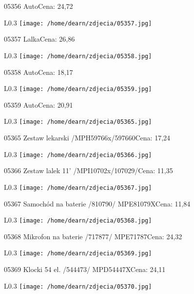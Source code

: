 05356 AutoCena: 24,72\newline
\begin{wrapfigure}{L}{0.3\textwidth}
\texttt{[image: /home/dearn/zdjecia/05357.jpg]}
\end{wrapfigure}
05357 LalkaCena: 26,86\newline
\begin{wrapfigure}{L}{0.3\textwidth}
\texttt{[image: /home/dearn/zdjecia/05358.jpg]}
\end{wrapfigure}
05358 AutoCena: 18,17\newline
\begin{wrapfigure}{L}{0.3\textwidth}
\texttt{[image: /home/dearn/zdjecia/05359.jpg]}
\end{wrapfigure}
05359 AutoCena: 20,91\newline
\begin{wrapfigure}{L}{0.3\textwidth}
\texttt{[image: /home/dearn/zdjecia/05365.jpg]}
\end{wrapfigure}
05365 Zestaw lekarski /MPH59766x/597660Cena: 17,24\newline
\begin{wrapfigure}{L}{0.3\textwidth}
\texttt{[image: /home/dearn/zdjecia/05366.jpg]}
\end{wrapfigure}
05366 Zestaw lalek 11' /MPI10702x/107029/Cena: 11,35\newline
\begin{wrapfigure}{L}{0.3\textwidth}
\texttt{[image: /home/dearn/zdjecia/05367.jpg]}
\end{wrapfigure}
05367 Samochód na baterie /810790/ MPE81079XCena: 11,84\newline
\begin{wrapfigure}{L}{0.3\textwidth}
\texttt{[image: /home/dearn/zdjecia/05368.jpg]}
\end{wrapfigure}
05368 Mikrofon na baterie /717877/ MPE71787Cena: 24,32\newline
\begin{wrapfigure}{L}{0.3\textwidth}
\texttt{[image: /home/dearn/zdjecia/05369.jpg]}
\end{wrapfigure}
05369 Klocki 54 el.  /544473/ MPD54447XCena: 24,11\newline
\begin{wrapfigure}{L}{0.3\textwidth}
\texttt{[image: /home/dearn/zdjecia/05370.jpg]}
\end{wrapfigure}
